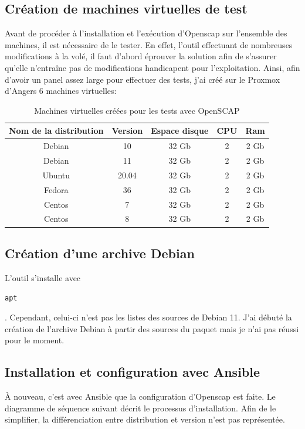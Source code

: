 \documentclass[12pt]{article}
\begin{document}
\subsection{Création de machines virtuelles de test}
Avant de procéder à l'installation et l'exécution d'Openscap sur l'ensemble des machines, il est nécessaire de le tester. 
En effet, l'outil effectuant de nombreuses modifications à la volé, il faut d'abord éprouver la solution afin de s'assurer qu'elle n'entraîne pas de modifications handicapent pour l'exploitation.
Ainsi, afin d'avoir un panel assez large pour effectuer des tests, j'ai créé sur le \gls{Proxmox} d'Angers 6 machines virtuelles:
\begin{table}[ht!]
    \begin{center}
        \begin{tabular}{| c | c | c | c | c |}
        \hline
        Nom de la distribution & Version & Espace disque & CPU & Ram 
        \tabularnewline

        \hline
        Debian & 10 & 32 Gb & 2 & 2 Gb
        \tabularnewline

        \hline
        Debian & 11 & 32 Gb & 2 & 2 Gb
        \tabularnewline 

        \hline
        Ubuntu & 20.04 & 32 Gb & 2 & 2 Gb
        \tabularnewline

        \hline
        Fedora & 36 & 32 Gb & 2 & 2 Gb
        \tabularnewline

        \hline
        Centos & 7 & 32 Gb & 2 & 2 Gb
        \tabularnewline

        \hline
        Centos & 8 & 32 Gb & 2 & 2 Gb
        \tabularnewline
        \hline
        \end{tabular}
    \end{center}
    \caption{Machines virtuelles créées pour les tests avec \gls{OpenSCAP}}
\end{table}

\subsection{Création d'une archive Debian}
L'outil s'installe avec \begin{code} \texttt{\gls{apt}}\end{code}.
Cependant, celui-ci n'est pas les listes des sources de Debian 11. 
J'ai débuté la création de l'archive Debian à partir des sources du paquet mais je n'ai pas réussi pour le moment.

\subsection{Installation et configuration avec Ansible}
À nouveau, c'est avec \gls{Ansible} que la configuration d'Openscap est faite. 
Le diagramme de séquence suivant décrit le processus d'installation. 
Afin de le simplifier, la différenciation entre distribution et version n'est pas représentée.
\end{document}
